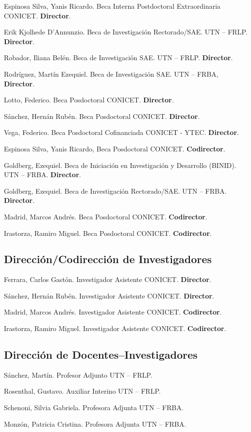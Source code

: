      Espinosa Silva, Yanis Ricardo. Beca Interna Postdoctoral Extraordinaria CONICET. \textbf{Director}.

     Erik Kjolhede D'Annunzio. Beca de Investigación Rectorado/SAE. UTN -- FRLP. \textbf{Director}.

     Robador, Iliana Belén. Beca de Investigación SAE. UTN -- FRLP. \textbf{Director}.

     Rodríguez, Martín Ezequiel. Beca de Investigación SAE. UTN -- FRBA, \textbf{Director}.

     Lotto, Federico. Beca Posdoctoral CONICET. \textbf{Director}.

     Sánchez, Hernán Rubén. Beca Posdoctoral CONICET. \textbf{Director}.

     Vega, Federico. Beca Posdoctoral Cofinanciada CONICET - YTEC. \textbf{Director}.

     Espinosa Silva, Yanis Ricardo, Beca Posdoctoral CONICET. \textbf{Codirector}.

     Goldberg, Ezequiel. Beca de Iniciación en Investigación y Desarrollo (BINID). UTN -- FRBA. \textbf{Director}.

     Goldberg, Ezequiel. Beca de Investigación Rectorado/SAE. UTN -- FRBA. \textbf{Director}.

     Madrid, Marcos Andrés. Beca Posdoctoral CONICET. \textbf{Codirector}.

     Irastorza, Ramiro Miguel. Beca Posdoctoral CONICET. \textbf{Codirector}.

\subsection{Dirección/Codirección de Investigadores}
 Ferrara, Carlos Gastón. Investigador Asistente CONICET. \textbf{Director}.

 Sánchez, Hernán Rubén. Investigador Asistente CONICET. \textbf{Director}.

     Madrid, Marcos Andrés. Investigador Asistente CONICET. \textbf{Codirector}.

     Irastorza, Ramiro Miguel. Investigador Asistente CONICET. \textbf{Codirector}.
  
\subsection{Dirección de Docentes--Investigadores}
 Sánchez, Martín. Profesor Adjunto UTN -- FRLP.
  
   Rosenthal, Gustavo. Auxiliar Interino UTN -- FRLP.
  
   Schenoni, Silvia Gabriela. Profesora Adjunta UTN -- FRBA.
  
   Monzón, Patricia Cristina. Profesora Adjunta UTN -- FRBA.
  

